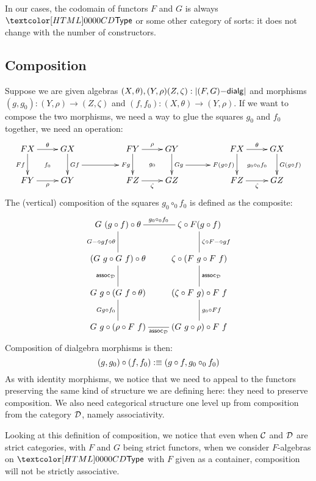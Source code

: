In our cases, the codomain of functors $F$ and $G$ is always $\Type$
or some other category of sorts: it does not change with the number of
constructors.

\subsection{Composition}

Suppose we are given algebras
$(X,\theta),(Y,\rho)(Z,\zeta) : | (F,G)\mathsf{-dialg} |$ and morphisms
$(g,g_0) : (Y,\rho) \to (Z,\zeta)$ and
$(f,f_0) : (X,\theta) \to (Y,\rho)$. If we want to compose the two
morphisms, we need a way to glue the squares $g_0$ and $f_0$ together,
\ie we need an operation:
$$
\xymatrix{
 FX \ar[r]^\theta \ar[d]_{F f}                 \ar@{}[dr]|{f_0} &GX \ar[d]^{G f}="Gf"
&
&FY \ar[r]^\rho   \ar[d]_{F g}="Fg"            \ar@{}[dr]|{g_0} &GY \ar[d]^{G g}="Gg"
&
&FX \ar[r]^\theta \ar[d]_{F (g \circ f)}="Fgf" \ar@{}[dr]|{g_0 \circ_0 f_0} &GX \ar[d]^{G (g \circ f)}
\\ 
 FY \ar[r]_{\rho}  &GY
&
&FZ \ar[r]_{\zeta} &GZ
&
&FZ \ar[r]_{\zeta} &GZ
\ar "Gf";"Fg"
\ar "Gg";"Fgf"
}
$$
The (vertical) composition of the squares $g_0 \circ_0 f_0$ is defined as the composite:
$$
\xymatrix{
G\ (g \circ f) \circ \theta
\ar@{-}[r]^{g_0 \circ_0 f_0}
\ar@{-}[d]_{\Gcomp g f \circ \theta}
&\zeta \circ F(g \circ f)
\ar@{-}[d]^{\zeta \circ \Fcomp g f}
\\
(G\ g \circ G\ f) \circ \theta
\ar@{-}[d]_{\assoc_{\Dd}}
&\zeta \circ (F\ g \circ F\ f)
\ar@{-}[d]^{\assoc_{\Dd}}
\\
G\ g \circ (G\ f \circ \theta)
\ar@{-}[d]_{G g \circ f_0}
&(\zeta \circ F\ g) \circ F\ f
\ar@{-}[d]^{g_0 \circ F f}
\\
G\ g \circ (\rho \circ F\ f)
\ar@{-}[r]_{\assoc_{\Dd}}
&(G\ g \circ \rho) \circ F\ f
}
$$
Composition of dialgebra morphisms is then:
$$
(g,g_0) \circ (f,f_0) :\equiv (g \circ f , g_0 \circ_0 f_0)
$$
As with identity morphisms, we notice that we need to appeal to the
functors preserving the same kind of structure we are defining here:
they need to preserve composition. We also need categorical structure
one level up from composition from the category $\mathcal{D}$, namely
associativity.

Looking at this definition of composition, we notice that even when
$\mathcal{C}$ and $\mathcal{D}$ are strict categories, with $F$ and $G$ being strict
functors, \eg when we consider $F$-algebras on $\Type$ with $F$ given
as a container, composition will not be strictly associative.

